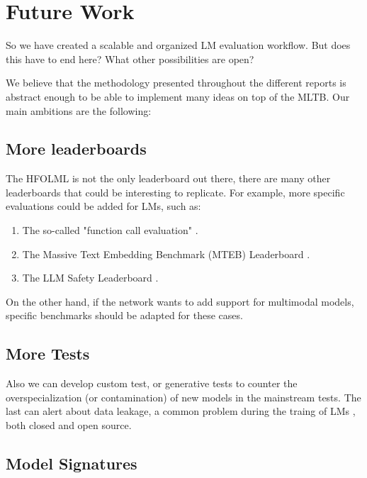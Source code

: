 \section{Future Work}\label{sec:z}

So we have created a scalable and organized \gls{LM} evaluation workflow. 
But does this have to end here? What other possibilities are open?

We believe that the methodology presented throughout the different reports is abstract enough to be able to implement many ideas on top of the \gls{MLTB}. Our main ambitions are the following:

\subsection*{More leaderboards}

The \gls{HFOLML} is not the only leaderboard out there, there are many other leaderboards that could be interesting to replicate. 
For example, more specific evaluations could be added for \glspl{LM}, such as:

\begin{enumerate}
    \item The so-called "function call evaluation" \cite{patil_gorilla_2023}.
    \item The Massive Text Embedding Benchmark (MTEB) Leaderboard \cite{muennighoff_mteb_2023}.
    \item The LLM Safety Leaderboard \cite{wang_decodingtrust_2024}.
\end{enumerate}

On the other hand, if the network wants to add support for multimodal models, specific benchmarks \cite{yue_mmmu_2024} should be adapted for these cases. 

\subsection*{More Tests}


Also we can develop custom test, or generative tests to counter the overspecialization (or contamination) of new models in the mainstream tests. 
The last can alert about data leakage, a common problem during the traing of \glspl{LM} \cite{zhang_careful_2024, golchin_data_2024, xu_benchmarking_2024, balloccu_leak_2024}, both closed and open source. 

\subsection*{Model Signatures}

